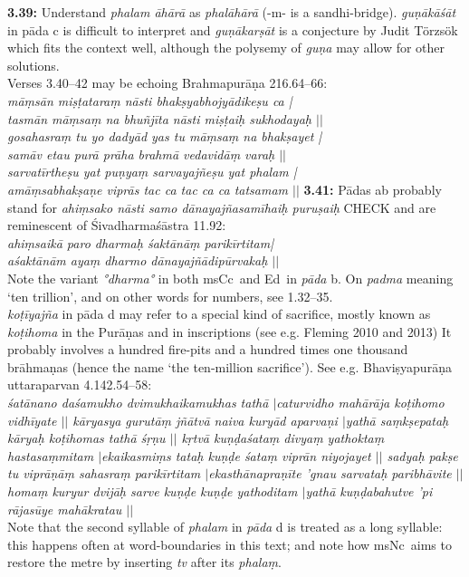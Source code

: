 \documentclass{article}
\newcommand{\vsnum}[1]{\textbf{#1}}
\newcommand{\skt}[1]{\textit{#1}}
\newcommand{\msCc}{msCc}
\newcommand{\msNc}{msNc}
\newcommand{\Ed}{Ed}
\begin{document}
\vsnum{3.39: }Understand \skt{phalam āhārā} as \skt{phalāhārā} (-m- is a sandhi-bridge). \skt{guṇākāśāt} in pāda c is difficult to interpret and \skt{guṇākarṣāt} is a conjecture by Judit Törzsök which fits the context well, although the polysemy of \skt{guṇa} may allow for other solutions. \\ Verses 3.40--42 may be echoing Brahmapurāṇa 216.64--66: \\ \skt{ māṃsān miṣṭataraṃ nāsti bhakṣyabhojyādikeṣu ca |\\ tasmān māṃsaṃ na bhuñjīta nāsti miṣṭaiḥ sukhodayaḥ $||$ \\ gosahasraṃ tu yo dadyād yas tu māṃsaṃ na bhakṣayet |\\ samāv etau purā prāha brahmā vedavidāṃ varaḥ $||$\\ sarvatīrtheṣu yat puṇyaṃ sarvayajñeṣu yat phalam |\\ amāṃsabhakṣaṇe viprās tac ca tac ca ca tatsamam $||$ }  \vsnum{3.41: }Pādas ab probably stand for \skt{ahiṃsako nāsti samo dānayajñasamīhaiḥ puruṣaiḥ} CHECK and are reminescent of Śivadharmaśāstra 11.92:\\ \skt{ ahiṃsaikā paro dharmaḥ śaktānāṃ parikīrtitam|\\ aśaktānām ayaṃ dharmo dānayajñādipūrvakaḥ $||$ } \\ Note the variant \skt{°dharma°} in both \msCc\ and \Ed\ in \skt{pāda} b. On \skt{padma} meaning `ten trillion', and on other words for numbers, see 1.32--35. \\ \skt{koṭīyajña} in pāda d may refer to a special kind of sacrifice, mostly known as \skt{koṭihoma} in the Purāṇas and in inscriptions (see e.g. Fleming 2010 and 2013) It probably involves a hundred fire-pits and a hundred times one thousand brāhmaṇas (hence the name `the ten-million sacrifice'). See e.g. Bhaviṣyapurāṇa uttaraparvan 4.142.54--58: \\ \skt{ śatānano daśamukho dvimukhaikamukhas tathā $|$caturvidho mahārāja koṭihomo vidhīyate $||$ kāryasya gurutāṃ jñātvā naiva kuryād aparvaṇi $|$yathā saṃkṣepataḥ kāryaḥ koṭihomas tathā śṛṇu $||$ kṛtvā kuṇḍaśataṃ divyaṃ yathoktaṃ hastasaṃmitam $|$ekaikasmiṃs tataḥ kuṇḍe śataṃ viprān niyojayet $||$ sadyaḥ pakṣe tu viprāṇāṃ sahasraṃ parikīrtitam $|$ekasthānapraṇīte 'gnau sarvataḥ paribhāvite $||$ homaṃ kuryur dvijāḥ sarve kuṇḍe kuṇḍe yathoditam $|$yathā kuṇḍabahutve 'pi rājasūye mahākratau $||$ } \\ Note that the second syllable of \skt{phalam} in \skt{pāda} d is treated as a long syllable: this happens often at word-boundaries in this text; and note how \msNc\ aims to restore the metre by inserting \skt{tv} after its \skt{phalaṃ}.
\end{document}
